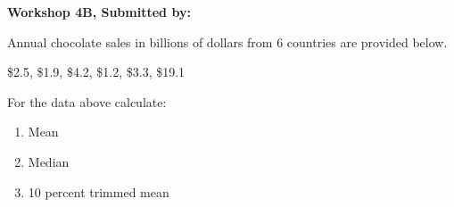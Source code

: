 \documentclass[11pt]{book}\usepackage[]{graphicx}\usepackage[]{color}
\begin{document}
\begin{exercises}
\begin{exercise}
\end{exercise}
\begin{solution}  %

\end{solution}

\clearpage

    \begin{exercise}  %

    \begin{center}
\begin{flushleft}\textbf{\large \hfill Workshop 4B, Submitted by: }\end{flushleft}

\end{center}

Annual chocolate sales in billions of dollars from 6 countries are provided below.

\$2.5, \$1.9, \$4.2, \$1.2, \$3.3, \$19.1

For the data above calculate:

\begin{enumerate}
  \item Mean
  \item Median
  \item 10 percent trimmed mean   %
\end{enumerate}
\end{exercise}
\begin{solution}  %

\end{solution}

\clearpage

    \begin{exercise}  %


\end{exercise}
\end{exercises}
\end{document}
